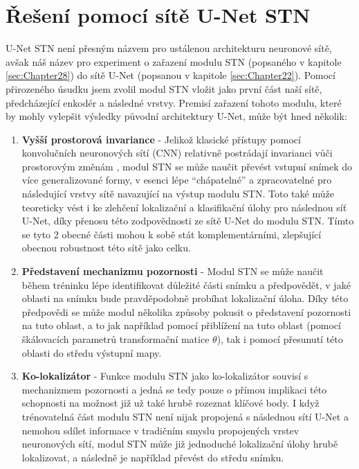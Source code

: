 \section{Řešení pomocí sítě U-Net STN}
\label{sec:Chapter45}
U-Net STN není přesným názvem pro ustálenou architekturu neuronové sítě, avšak náš název pro experiment o zařazení modulu STN (popsaného v kapitole \ref{sec:Chapter28}) do sítě U-Net (popsanou v kapitole \ref{sec:Chapter22}). Pomocí přirozeného úsudku jsem zvolil modul STN vložit jako první část naší sítě, předcházející enkodér a následné vrstvy. Premisí zařazení tohoto modulu, které by mohly vylepšit výsledky původní architektury U-Net, může být hned několik:
\begin{enumerate}
    \item \textbf{Vyšší prostorová invariance} - Jelikož klasické přístupy pomocí konvolučních neuronových sítí (CNN) relativně postrádají invarianci vůči prostorovým změnám \cite{stn}, modul STN se může naučit převést vstupní snímek do více generalizované formy, v esenci lépe \enquote{chápatelné} a zpracovatelné pro následující vrstvy sítě navazující na výstup modulu STN. Toto také může teoreticky vést i ke zlehčení lokalizační a klasifikační úlohy pro následnou síť U-Net, díky přenosu této zodpovědnosti ze sítě U-Net do modulu STN. Tímto se tyto 2 obecné části mohou k sobě stát komplementárními, zlepšující obecnou robustnost této sítě jako celku.
    \item \textbf{Představení mechanizmu pozornosti} - Modul STN se může naučit během tréninku lépe identifikovat důležité části snímku a předpovědět, v jaké oblasti na snímku bude pravděpodobně probíhat lokalizační úloha. Díky této předpovědi se může modul několika způsoby pokusit o představení pozornosti na tuto oblast, a to jak například pomocí přiblížení na tuto oblast (pomocí škálovacích parametrů transformační matice $\theta$), tak i pomocí přesunutí této oblasti do středu výstupní mapy.
    \item \textbf{Ko-lokalizátor} - Funkce modulu STN jako ko-lokalizátor souvisí s mechanizmem pozornosti a jedná se tedy pouze o přímou implikaci této schopnosti na možnost již už také hrubě rozeznat klíčové body. I když trénovatelná část modulu STN není nijak propojená s následnou sítí U-Net a nemohou sdílet informace v tradičním smyslu propojených vrstev neuronových sítí, modul STN může již jednoduché lokalizační úlohy hrubě lokalizovat, a následně je například převést do středu snímku.
\end{enumerate}

